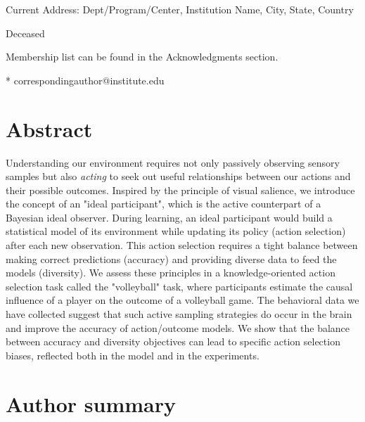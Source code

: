 \documentclass[10pt,letterpaper]{article}
\begin{document}
\begin{flushleft}
\textcurrency Current Address: Dept/Program/Center, Institution Name, City, State, Country %

\dag Deceased

\textpilcrow Membership list can be found in the Acknowledgments section.

* correspondingauthor@institute.edu

\end{flushleft}
\section*{Abstract}
Understanding our environment requires not only passively observing sensory samples but also \emph{acting} to seek out useful relationships between our actions and their possible outcomes. Inspired by the principle of visual salience, we introduce the concept of an "ideal participant", which is the active counterpart of a Bayesian ideal observer. During learning, an ideal participant would build a statistical model of its environment while updating its policy (action selection) after each new observation. This action selection requires a tight balance between making correct predictions (accuracy) and providing diverse data to feed the models (diversity).
We assess these principles in a knowledge-oriented action selection task called the "volleyball" task, where participants estimate the causal influence of a player on the outcome of a volleyball game. The behavioral data we have collected suggest that such active sampling strategies do occur in the brain and improve the accuracy of action/outcome models. We show that the balance between accuracy and diversity objectives can lead to specific action selection biases, reflected both in the model and in the experiments.

\section*{Author summary}
\end{document}
